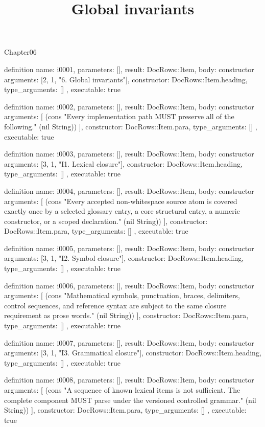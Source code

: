 \begin{lexlean}{Chapter06}
\title{Global invariants}
\begin{semanticmodule}
definition{
  name: i0001,
  parameters: [],
  result: DocRows::Item,
  body: constructor{
    arguments: [2, 1, "6. Global invariants"],
    constructor: DocRows::Item.heading,
    type_arguments: []
  },
  executable: true
}

definition{
  name: i0002,
  parameters: [],
  result: DocRows::Item,
  body: constructor{
    arguments: [
      (cons "Every implementation path MUST preserve all of the following." (nil String))
    ],
    constructor: DocRows::Item.para,
    type_arguments: []
  },
  executable: true
}

definition{
  name: i0003,
  parameters: [],
  result: DocRows::Item,
  body: constructor{
    arguments: [3, 1, "I1. Lexical closure"],
    constructor: DocRows::Item.heading,
    type_arguments: []
  },
  executable: true
}

definition{
  name: i0004,
  parameters: [],
  result: DocRows::Item,
  body: constructor{
    arguments: [
      (cons "Every accepted non-whitespace source atom is covered exactly once by a selected glossary entry, a core structural entry, a numeric constructor, or a scoped declaration." (nil String))
    ],
    constructor: DocRows::Item.para,
    type_arguments: []
  },
  executable: true
}

definition{
  name: i0005,
  parameters: [],
  result: DocRows::Item,
  body: constructor{
    arguments: [3, 1, "I2. Symbol closure"],
    constructor: DocRows::Item.heading,
    type_arguments: []
  },
  executable: true
}

definition{
  name: i0006,
  parameters: [],
  result: DocRows::Item,
  body: constructor{
    arguments: [
      (cons "Mathematical symbols, punctuation, braces, delimiters, control sequences, and reference syntax are subject to the same closure requirement as prose words." (nil String))
    ],
    constructor: DocRows::Item.para,
    type_arguments: []
  },
  executable: true
}

definition{
  name: i0007,
  parameters: [],
  result: DocRows::Item,
  body: constructor{
    arguments: [3, 1, "I3. Grammatical closure"],
    constructor: DocRows::Item.heading,
    type_arguments: []
  },
  executable: true
}

definition{
  name: i0008,
  parameters: [],
  result: DocRows::Item,
  body: constructor{
    arguments: [
      (cons "A sequence of known lexical items is not sufficient. The complete component MUST parse under the versioned controlled grammar." (nil String))
    ],
    constructor: DocRows::Item.para,
    type_arguments: []
  },
  executable: true
}


\end{semanticmodule}
\end{lexlean}
